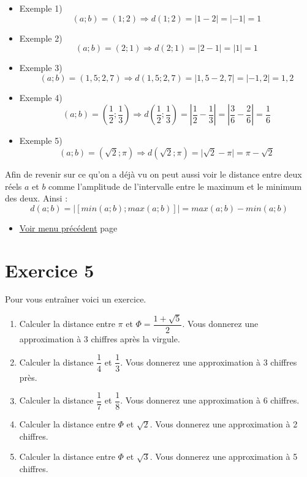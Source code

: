 \documentclass[a4paper,11pt]{book}
\begin{document}
\begin{itemize}
\item Exemple 1) \[(a; b) = (1; 2) \Rightarrow d(1; 2) = \lvert 1 - 2 \rvert =
  \lvert -1\rvert = 1\]
\item Exemple 2) \[(a; b) = (2; 1) \Rightarrow d(2; 1) = \lvert 2 - 1 \rvert =
  \lvert 1\rvert = 1\]
\item Exemple 3) \[(a; b) = (1,5; 2,7) \Rightarrow d(1,5; 2,7) = \lvert 1,5 -
  2,7 \rvert = \lvert -1,2\rvert = 1,2\]
\item Exemple 4) \[(a; b) = \left(\dfrac{1}{2}; \dfrac{1}{3}\right) \Rightarrow
  d\left(\dfrac{1}{2}; \dfrac{1}{3}\right) = \left\lvert \dfrac{1}{2} -
  \dfrac{1}{3} \right\rvert = \left\lvert \dfrac{3}{6} - \dfrac{2}{6}\right\rvert =
  \dfrac{1}{6}\]
\item Exemple 5) \[(a; b) = (\sqrt{2}; \pi) \Rightarrow d(\sqrt{2}; \pi) =
  \lvert \sqrt{2} - \pi \rvert = \pi - \sqrt{2}\]
\end{itemize}


Afin de revenir sur ce qu'on a déjà vu on peut aussi voir le
distance entre deux réels \(a\) et \(b\) comme
l'amplitude de l'intervalle entre le maximum et le
minimum des deux.
Ainsi :
\[d(a ; b) = \left\vert [min(a ; b) ; max(a ; b)]\right\vert = max(a ;
b) - min(a ; b)\]



\begin{itemize}
\item \hyperref[org68323fe]{Voir menu précédent}
page~\pageref{page:content3-menu}
\end{itemize}

\clearpage

\section{Exercice 5}
\label{sec:orgf73b528}
\label{org65c295d}
\label{page:sec2.3.2exo5}

Pour vous entraîner voici un exercice.

\begin{enumerate}
\item Calculer la distance entre \(\pi\) et \(\Phi =
   \dfrac{1 + \sqrt{5}}{2}\). Vous donnerez une approximation à 3
chiffres après la virgule.
\item Calculer la distance \(\dfrac{1}{4}\) et \(\dfrac{1}{3}\). Vous
donnerez une approximation à 3 chiffres près.
\item Calculer la distance \(\dfrac{1}{7}\) et \(\dfrac{1}{8}\). Vous
donnerez une approximation à 6 chiffres.
\item Calculer la distance entre \(\Phi\) et \(\sqrt{2}\). Vous donnerez
une approximation à 2 chiffres.
\item Calculer la distance entre \(\Phi\) et \(\sqrt{3}\). Vous donnerez
une approximation à 5 chiffres.
\end{enumerate}
\end{document}
